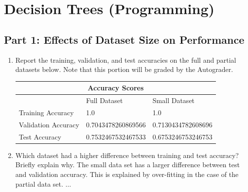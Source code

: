 \section{Decision Trees (Programming)}

\subsection{Part 1: Effects of Dataset Size on Performance}
\begin{enumerate}
    \item Report the training, validation, and test accuracies on the full and partial datasets below. Note that this portion will be graded by the Autograder.
    \begin{center}
        \begin{tabular}{ |p{6cm}||p{3cm}|p{3cm}|  }
         \hline
         \multicolumn{3}{|c|}{Accuracy Scores} \\
         \hline
         & Full Dataset & Small Dataset\\
         \hline
         Training Accuracy   & 1.0    &1.0\\
         Validation Accuracy   & 0.7043478260869566    &0.7130434782608696\\
         Test Accuracy   & 0.7532467532467533    &0.6753246753246753\\
         \hline
        \end{tabular}
    \end{center}
    \item Which dataset had a higher difference between training and test accuracy? Briefly explain why.
    \newline
    \newline
    The small data set has a larger difference between test and validation accuracy. This is explained by over-fitting in the case of the partial data set. 
    $\ldots$
\end{enumerate}

